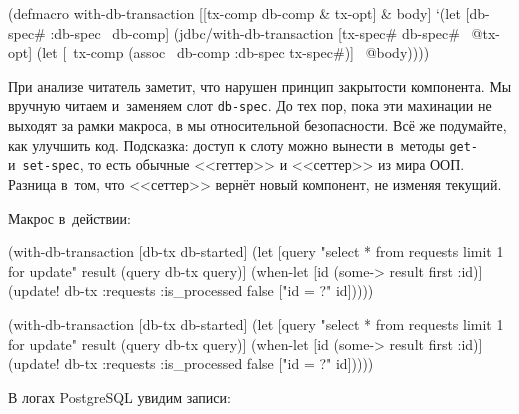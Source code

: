 \else

\begin{english}
  \begin{clojure}
(defmacro with-db-transaction
  [[tx-comp db-comp & tx-opt] & body]
  `(let [{db-spec# :db-spec} ~db-comp]
     (jdbc/with-db-transaction
       [tx-spec# db-spec# ~@tx-opt]
       (let [~tx-comp (assoc ~db-comp :db-spec tx-spec#)]
         ~@body))))
  \end{clojure}
\end{english}

\fi


При анализе читатель заметит, что нарушен принцип закрытости компонента. Мы
вручную читаем и~заменяем слот \verb|db-spec|. До тех пор, пока эти махинации не
выходят за рамки макроса, в мы относительной безопасности. Всё же подумайте, как
улучшить код. Подсказка: доступ к слоту можно вынести в~методы \verb|get-|
и~\verb|set-spec|, то есть обычные <<геттер>> и <<сеттер>> из мира ООП. Разница
в~том, что <<сеттер>> вернёт новый компонент, не изменяя текущий.

Макрос в~действии:

\ifx\DEVICETYPE\MOBILE

\begin{english}
  \begin{clojure}
(with-db-transaction
  [db-tx db-started]
  (let [query "select * from requests
               limit 1 for update"
        result (query db-tx query)]
    (when-let [id (some->
                    result first :id)]
      (update! db-tx :requests
               {:is_processed false}
               ["id = ?" id]))))
  \end{clojure}
\end{english}

\else

\begin{english}
  \begin{clojure}
(with-db-transaction
  [db-tx db-started]
  (let [query "select * from requests limit 1 for update"
        result (query db-tx query)]
    (when-let [id (some-> result first :id)]
      (update! db-tx :requests
               {:is_processed false}
               ["id = ?" id]))))
  \end{clojure}
\end{english}

\fi

\noindent
В логах PostgreSQL увидим записи:

